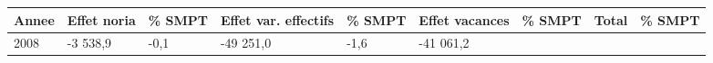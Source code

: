 \begin{longtable}[]{@{}lllllllll@{}}
\toprule
\begin{minipage}[b]{0.05\columnwidth}\raggedright
Annee\strut
\end{minipage} & \begin{minipage}[b]{0.10\columnwidth}\raggedright
Effet noria\strut
\end{minipage} & \begin{minipage}[b]{0.06\columnwidth}\raggedright
\% SMPT\strut
\end{minipage} & \begin{minipage}[b]{0.16\columnwidth}\raggedright
Effet var. effectifs\strut
\end{minipage} & \begin{minipage}[b]{0.06\columnwidth}\raggedright
\% SMPT\strut
\end{minipage} & \begin{minipage}[b]{0.12\columnwidth}\raggedright
Effet vacances\strut
\end{minipage} & \begin{minipage}[b]{0.06\columnwidth}\raggedright
\% SMPT\strut
\end{minipage} & \begin{minipage}[b]{0.09\columnwidth}\raggedright
Total\strut
\end{minipage} & \begin{minipage}[b]{0.06\columnwidth}\raggedright
\% SMPT\strut
\end{minipage}\tabularnewline
\midrule
\endhead
\begin{minipage}[t]{0.05\columnwidth}\raggedright
2008\strut
\end{minipage} & \begin{minipage}[t]{0.10\columnwidth}\raggedright
-3 538,9\strut
\end{minipage} & \begin{minipage}[t]{0.06\columnwidth}\raggedright
-0,1\strut
\end{minipage} & \begin{minipage}[t]{0.16\columnwidth}\raggedright
-49 251,0\strut
\end{minipage} & \begin{minipage}[t]{0.06\columnwidth}\raggedright
-1,6\strut
\end{minipage} & \begin{minipage}[t]{0.12\columnwidth}\raggedright
-41 061,2\strut
\end{minipage} & \begin{minipage}[t]{0.06\columnwidth}\raggedright

\end{minipage}
\end{longtable}
